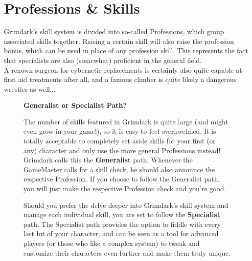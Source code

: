 \chapter{Professions \& Skills}
Grimdark's skill system is divided into so-called Professions, which group associated skills together. Raising a certain skill will also raise the profession bonus, which can be used in place of any profession skill. 
This represents the fact that specialists are also (somewhat) proficient in the general field.\\
A renown surgeon for cybernetic replacements is certainly also quite capable at first aid treatments after all, and a famous climber is quite likely a dangerous wrestler as well...
\begin{figure}[ht]
	\begin{DndReadAloud}
	\textbf{Generalist or Specialist Path?}

	The number of skills featured in Grimdark is quite large (and might even grow in your game!), so it is easy to feel overhwelmed.
	It is totally acceptable to completely set aside skills for your first (or any) character and only use the more general Professions instead! Grimdark calls this the \textbf{Generalist} path.
	Whenever the GameMaster calls for a skill check, he should also announce the respective Profession.
	If you choose to follow the Generalist path, you will just make the respective Profession check and you're good.

	Should you prefer the delve deeper into Grimdark's skill system and manage each individual skill, you are set to follow the \textbf{Specialist} path.
	The Specialist path provides the option to fiddle with every last bit of your character, and can be seen as a tool for advanced players (or those who like a complex system) to tweak and customize their characters even further and make them truly unique.
	\end{DndReadAloud}
\end{figure}

